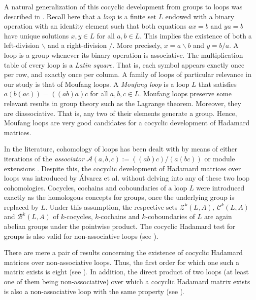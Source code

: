 \documentclass[11pt,a4paper]{article}
\begin{document}
A natural generalization of this cocyclic development from groups to loops was described in \citep{Alvarez2019,Alvarez2020,Falcon2021}. Recall here that a {\em loop} is a finite set $L$ endowed with a binary operation with an identity element such that both equations $ax=b$ and $ya=b$ have unique solutions $x,y\in L$ for all $a,b\in L$. This implies the existence of both a left-division $\backslash$ and a right-division $/$. More precisely, $x=a\backslash b$ and $y=b/a$. A loop is a group whenever its binary operation is associative. The multiplication table of every loop is a {\em Latin square}. That is, each symbol appears exactly once per row, and exactly once per column. A family of loops of particular relevance in our study is that of Moufang loops. A {\em Moufang loop} \citep{Moufang1935} is a loop $L$ that satisfies $a(b(ac))=((ab)a)c$ for all $a,b,c\in L$. Moufang loops preserve some relevant results in group theory such as the Lagrange theorem. Moreover, they are diassociative. That is, any two of their elements generate a group. Hence, Moufang loops are very good candidates for a cocyclic development of Hadamard matrices.

In the literature, cohomology of loops has been dealt with by means of either iterations of the {\em associator} $\mathcal{A}(a,b,c):=((ab)c)/(a(bc))$ \citep{Eilenberg1947} or module extensions \citep{Johnson1990}. Despite this, the cocyclic development of Hadamard matrices over loops was introduced by \'Alvarez et al. \citep{Alvarez2019} without delving into any of these two loop cohomologies. Cocycles, cochains and coboundaries of a loop $L$ were introduced exactly as the homologous concepts for groups, once the underlying group is replaced by $L$. Under this assumption, the respective sets $\mathcal{Z}^k(L,A)$, $\mathcal{C}^k(L,A)$ and $\mathcal{B}^k(L,A)$ of $k$-cocycles, $k$-cochains and $k$-coboundaries of $L$ are again abelian groups under the pointwise product. The cocyclic Hadamard test for groups is also valid for non-associative loops (see \citealp[Theorem~29]{Alvarez2019}).

There are mere a pair of results concerning the existence of cocyclic Hadamard matrices over non-associative loops. Thus, the first order for which one such a matrix exists is eight (see \citealp[Theorem~30]{Alvarez2019}). In addition, the direct product of two loops (at least one of them being non-associative) over which a cocyclic Hadamard matrix exists is also a non-associative loop with the same property (see \citealp[Theorem~31]{Alvarez2019}).
\end{document}
